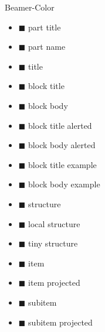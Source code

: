 {\begin{frame}{Beamer-Color}
\begin{multicols}{3}
\begin{itemize}
                    \item { $\blacksquare$ part title }\\
                    \item { $\blacksquare$ part name }\\
                    \item { $\blacksquare$ title }\\
                    \item { $\blacksquare$ block title }\\
                    \item { $\blacksquare$ block body }\\
                    \item { $\blacksquare$ block title alerted }\\
                    \item { $\blacksquare$ block body alerted }\\
                    \item { $\blacksquare$ block title example }\\
                    \item { $\blacksquare$ block body example }\\
                    \item { $\blacksquare$ structure }\\
                    \item { $\blacksquare$ local structure }\\
                    \item { $\blacksquare$ tiny structure }\\
                    \item { $\blacksquare$ item }\\
                    \item { $\blacksquare$ item projected }\\
                    \item { $\blacksquare$ subitem }\\
                    \item { $\blacksquare$ subitem projected }\\

\end{itemize}
\end{multicols}
\end{frame}}
